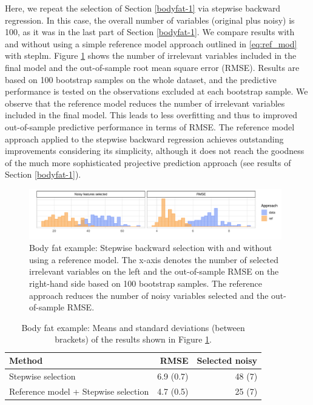 \documentclass[a4]{article}
\theoremstyle{definition}
\begin{document}
Here, we repeat the selection of Section \ref{bodyfat-1} via
stepwise backward regression. In this case, the overall number of
variables (original plus noisy) is 100, as it was in the last part of
Section \ref{bodyfat-1}. We compare results with and without using
a simple reference model approach outlined in \eqref{eq:ref_mod} with
steplm. Figure \ref{fig:bodyfat_step_refvsdata} shows the number of
irrelevant variables included in the final model and the out-of-sample
root mean square error (RMSE). Results are based on 100 bootstrap
samples on the whole dataset, and the predictive performance is tested
on the observations excluded at each bootstrap sample. We observe that
the reference model reduces the number of irrelevant variables included
in the final model. This leads to less overfitting and thus to
improved out-of-sample predictive performance in terms of RMSE. The
reference model approach applied to the stepwise backward regression
achieves outstanding improvements considering its simplicity, although it
does not reach the goodness of the much more sophisticated projective
prediction approach (see results of Section \ref{bodyfat-1}).
\begin{figure}[tp]
  \centering
  \includegraphics[width=0.98\textwidth]{graphics/bodyfat_step_refvsdata.pdf}
  \vspace{-0.7\baselineskip}
  \caption{Body fat example: Stepwise backward selection with and without using a reference model. The x-axis denotes the number of selected irrelevant variables on the left and the out-of-sample RMSE on the right-hand side based on 100 bootstrap samples. The reference approach reduces the number of noisy variables selected and the out-of-sample RMSE.}
  \label{fig:bodyfat_step_refvsdata}
\end{figure}
\begin{table}[tp]
\footnotesize
\centering
\begin{tabular}{l|rr}
Method & RMSE & Selected noisy \\ 
  \hline
Stepwise selection & 6.9 (0.7) & 48 (7)    \\
Reference model + Stepwise selection & 4.7 (0.5) & 25 (7)   \\
\end{tabular}
\caption{Body fat example: Means and standard deviations (between brackets) of the results shown in Figure \ref{fig:bodyfat_step_refvsdata}.}
\label{tab:step_refvsdata}
\end{table}
\end{document}
